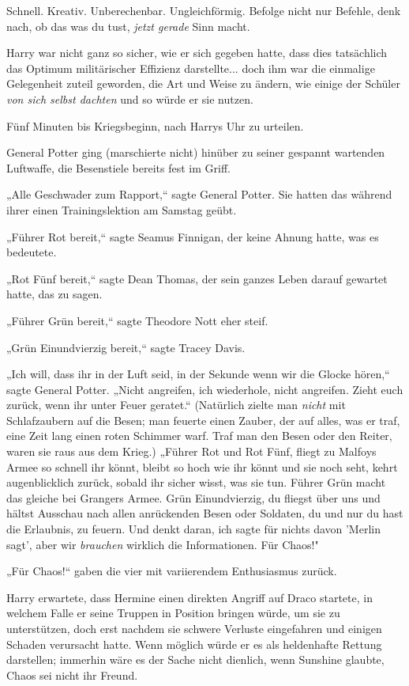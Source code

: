 {Schnell. Kreativ. Unberechenbar. Ungleichförmig. Befolge nicht nur Befehle, denk nach, ob das was du tust, \emph{jetzt gerade} Sinn macht.

Harry war nicht ganz so sicher, wie er sich gegeben hatte, dass dies tatsächlich das Optimum militärischer Effizienz darstellte... doch ihm war die einmalige Gelegenheit zuteil geworden, die Art und Weise zu ändern, wie einige der Schüler \emph{von sich selbst dachten} und so würde er sie nutzen.

Fünf Minuten bis Kriegsbeginn, nach Harrys Uhr zu urteilen.

General Potter ging (marschierte nicht) hinüber zu seiner gespannt wartenden Luftwaffe, die Besenstiele bereits fest im Griff.

„Alle Geschwader zum Rapport,“ sagte General Potter. Sie hatten das während ihrer einen Trainingslektion am Samstag geübt.

„Führer Rot bereit,“ sagte Seamus Finnigan, der keine Ahnung hatte, was es bedeutete.

„Rot Fünf bereit,“ sagte Dean Thomas, der sein ganzes Leben darauf gewartet hatte, das zu sagen.

„Führer Grün bereit,“ sagte Theodore Nott eher steif.

„Grün Einundvierzig bereit,“ sagte Tracey Davis.

„Ich will, dass ihr in der Luft seid, in der Sekunde wenn wir die Glocke hören,“ sagte General Potter. „Nicht angreifen, ich wiederhole, nicht angreifen. Zieht euch zurück, wenn ihr unter Feuer geratet.“ (Natürlich zielte man \emph{nicht} mit Schlafzaubern auf die Besen; man feuerte einen Zauber, der auf alles, was er traf, eine Zeit lang einen roten Schimmer warf. Traf man den Besen oder den Reiter, waren sie raus aus dem Krieg.) „Führer Rot und Rot Fünf, fliegt zu Malfoys Armee so schnell ihr könnt, bleibt so hoch wie ihr könnt und sie noch seht, kehrt augenblicklich zurück, sobald ihr sicher wisst, was sie tun. Führer Grün macht das gleiche bei Grangers Armee. Grün Einundvierzig, du fliegst über uns und hältst Ausschau nach allen anrückenden Besen oder Soldaten, du und nur du hast die Erlaubnis, zu feuern. Und denkt daran, ich sagte für nichts davon 'Merlin sagt', aber wir \emph{brauchen} wirklich die Informationen. Für Chaos!"

„Für Chaos!“ gaben die vier mit variierendem Enthusiasmus zurück.

Harry erwartete, dass Hermine einen direkten Angriff auf Draco startete, in welchem Falle er seine Truppen in Position bringen würde, um sie zu unterstützen, doch erst nachdem sie schwere Verluste eingefahren und einigen Schaden verursacht hatte. Wenn möglich würde er es als heldenhafte Rettung darstellen; immerhin wäre es der Sache nicht dienlich, wenn Sunshine glaubte, Chaos sei nicht ihr Freund.

}
